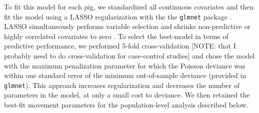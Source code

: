 \documentclass[a4paper]{article}
\begin{document}
To fit this model for each pig, we standardized all continuous covariates and then fit the model using a LASSO regularization with the the \texttt{glmnet} package \citep{Friedman2010}. LASSO simultaneously performs variable selection and shrinks non-predictive or highly correlated covariates to zero \cite{James2013}. To select the best-model in terms of predictive performance, we performed 5-fold cross-validation [NOTE: that I probably need to do cross-validation for case-control studies] and chose the model with the maximum penalization parameter for which the Poisson deviance was within one standard error of the minimum out-of-sample deviance (provided in \texttt{glmnet}). This approach increases regularization and decreases the number of parameters in the model, at only a small cost to deviance. We then retained the best-fit movement parameters for the population-level analysis described below.



\end{document}
